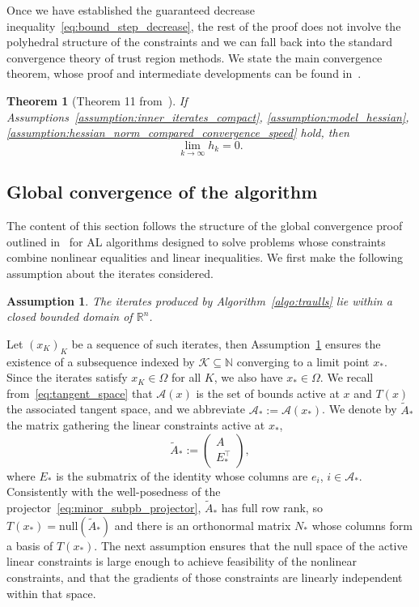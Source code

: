 \documentclass{article}
\numberwithin{equation}{section}
\newcommand{\RR}{{\mathbb{R}}} %
\newcommand{\NN}{{\mathbb{N}}} %
\newcommand{\calA}{{\mathcal{A}}}
\newcommand{\calK}{{\mathcal{K}}}
\theoremstyle{plain}
\newtheorem{theorem}{Theorem}
\newtheorem{assumption}{Assumption}
\begin{document}
	Once we have established the guaranteed decrease inequality~\eqref{eq:bound_step_decrease}, the rest of the proof does not involve the polyhedral structure of the constraints and we can fall back into the standard convergence theory of trust region methods. We state the main convergence theorem, whose proof and intermediate developments can be found in~\cite{conn-etal:1988a}.
	\begin{theorem}[Theorem 11 from~\cite{conn-etal:1988a}]
		If Assumptions~\ref{assumption:inner_iterates_compact}, \ref{assumption:model_hessian}, \ref{assumption:hessian_norm_compared_convergence_speed} hold, then
		\[\lim\limits_{k\to \infty} h_k = 0.\]
	\end{theorem}
	
	\subsection{Global convergence of the algorithm}
	
	The content of this section follows the structure of the global convergence proof outlined in~\cite{conn-etal:1996b} for AL algorithms designed to solve problems whose constraints combine nonlinear equalities and linear inequalities. We first make the following assumption about the iterates considered.
	
	\begin{assumption}\label{assumption:iterates_domain_bounded}
		The iterates produced by Algorithm~\ref{algo:traulls} lie within a closed bounded domain of $\RR^n$.
	\end{assumption}
	
	Let $(x_K)_K$ be a sequence of such iterates, then Assumption~\ref{assumption:iterates_domain_bounded} ensures the existence of a subsequence indexed by $\calK \subseteq \NN$ converging to a limit point $x_*$. Since the iterates satisfy $x_K \in \Omega$ for all $K$, we also have $x_* \in \Omega$. We recall from~\eqref{eq:tangent_space} that $\calA(x)$ is the set of bounds active at $x$ and $T(x)$ the associated tangent space, and we abbreviate $\calA_* := \calA(x_*)$. We denote by $\tilde A_*$ the matrix gathering the linear constraints active at $x_*$,
	\begin{equation*}
		\tilde A_* := \begin{pmatrix} A \\ E^\top_* \end{pmatrix},
	\end{equation*}
	where $E_*$ is the submatrix of the identity whose columns are $e_i$, $i \in \calA_*$. Consistently with the well-posedness of the projector~\eqref{eq:minor_subpb_projector}, $\tilde A_*$ has full row rank, so $T(x_*) = \mathrm{null}(\tilde A_*)$ and there is an orthonormal matrix $N_*$ whose columns form a basis of $T(x_*)$. The next assumption ensures that the null space of the active linear constraints is large enough to achieve feasibility of the nonlinear constraints, and that the gradients of those constraints are linearly independent within that space.
	
\end{document}
